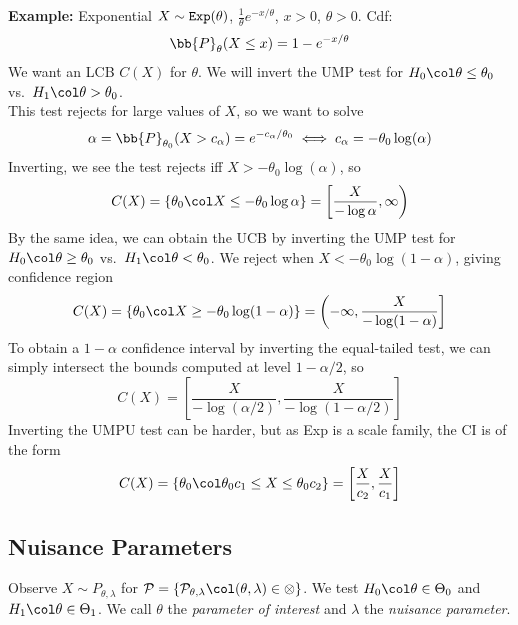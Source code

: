 \begin{example}{\textbf{Example:} Exponential}
    $X \sim \tt{Exp}(\theta)$, $\frac{1}{\theta}e^{-x/\theta}$, $x > 0$, $\theta > 0$. Cdf:
    \[ \bb{P}_{\theta}(X \leq x) = 1 - e^{-x/\theta} \]
    We want an LCB $C(X)$ for $\theta$. We will invert the UMP test for $H_0 \col \theta \leq \theta_0$ vs.\ $H_1 \col \theta > \theta_0$.\\

    This test rejects for large values of $X$, so we want to solve
    \[ \alpha = \bb{P}_{\theta_0}(X > c_{\alpha}) = e^{-c_{\alpha}/\theta_0} \iff c_{\alpha} = -\theta_0\log(\alpha) \]
    Inverting, we see the test rejects iff $X > -\theta_0\log(\alpha)$, so
    \[ C(X) = \{\theta_0 \col X \leq -\theta_0\log\alpha\} = \left[\frac{X}{-\log\alpha}, \infty\right) \]
    By the same idea, we can obtain the UCB by inverting the UMP test for $H_0 \col \theta \geq \theta_0$ vs.\ $H_1 \col \theta < \theta_0$. We reject when $X < -\theta_0\log(1 - \alpha)$, giving confidence region
    \[ C(X) = \{\theta_0 \col X \geq -\theta_0\log(1 - \alpha)\} = \left(-\infty, \frac{X}{-\log(1 - \alpha)}\right] \]
    To obtain a $1 - \alpha$ confidence interval by inverting the equal-tailed test, we can simply intersect the bounds computed at level $1 - \alpha/2$, so
    \[ C(X) = \left[\frac{X}{-\log(\alpha/2)}, \frac{X}{-\log(1 - \alpha/2)}\right] \]
    Inverting the UMPU test can be harder, but as Exp is a scale family, the CI is of the form
    \[ C(X) = \{\theta_0 \col \theta_0c_1 \leq X \leq \theta_0c_2\} = \left[\frac{X}{c_2}, \frac{X}{c_1}\right] \]
\end{example}

\subsection*{Nuisance Parameters}
\sectionspace

Observe $X \sim P_{\theta, \lambda}$ for $\cal{P} = \{P_{\theta, \lambda} \col (\theta, \lambda) \in \Omega\}$. We test $H_0 \col \theta \in \Theta_0$ and $H_1 \col \theta \in \Theta_1$. We call $\theta$ the \emph{parameter of interest} and $\lambda$ the \emph{nuisance parameter}.\\

